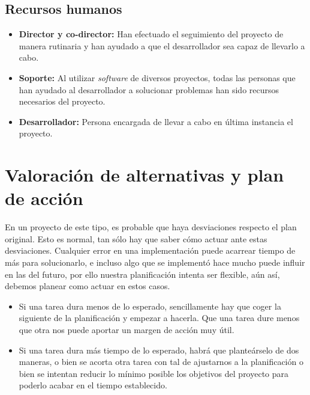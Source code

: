\subsection{Recursos humanos}

\begin{itemize}
 \item \textbf{Director y co-director: } Han efectuado el seguimiento del proyecto de manera rutinaria y han ayudado a que el desarrollador sea capaz de llevarlo a cabo. 
 \item \textbf{Soporte: } Al utilizar \textit{software} de diversos proyectos, todas las personas que han ayudado al desarrollador a solucionar problemas han sido recursos necesarios del proyecto.
 \item \textbf{Desarrollador: } Persona encargada de llevar a cabo en última instancia el proyecto.
\end{itemize}

\section{Valoración de alternativas y plan de acción}

En un proyecto de este tipo, es probable que haya desviaciones respecto el plan original. Esto es normal, tan sólo hay que saber cómo actuar ante estas desviaciones. Cualquier error en una implementación puede acarrear tiempo de más para solucionarlo, e incluso algo que se implementó hace mucho puede influir en las del futuro, por ello nuestra planificación intenta ser flexible, aún así, debemos planear como actuar en estos casos.

\begin{itemize}
 \item Si una tarea dura menos de lo esperado, sencillamente hay que coger la siguiente de la planificación y empezar a hacerla. Que una tarea dure menos que otra nos puede aportar un margen de acción muy útil.
 \item Si una tarea dura más tiempo de lo esperado, habrá que planteárselo de dos maneras, o bien se acorta otra tarea con tal de ajustarnos a la planificación o bien se intentan reducir lo mínimo posible los objetivos del proyecto para poderlo acabar en el tiempo establecido.
\end{itemize}

